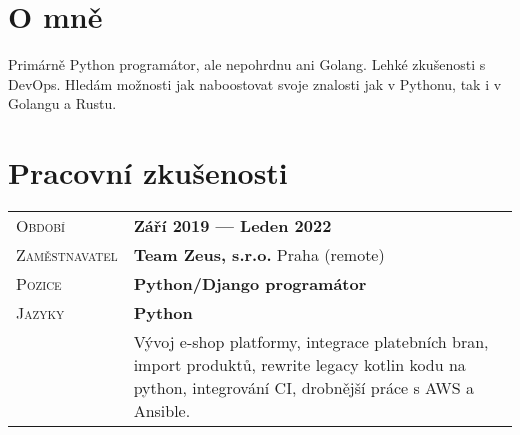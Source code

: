 \documentclass[a4paper, oneside, final]{scrartcl} %
\newcommand{\gray}{\rowcolor[gray]{.90}} %
\begin{document}
\begin{center} %


{\fontsize{36}{36}\selectfont\scshape{}} %

\vspace{1.5cm} %


\section{O mně}

Primárně Python programátor, ale nepohrdnu ani Golang. Lehké zkušenosti s DevOps. Hledám možnosti jak naboostovat svoje znalosti jak v Pythonu, tak i v Golangu a Rustu.\\


\section{Pracovní zkušenosti}

\begin{tabularx}{0.97\linewidth}{>{\raggedleft\scshape}p{3cm}X}
\gray Období & \textbf{Září 2019 --- Leden 2022}\\
\gray Zaměstnavatel & \textbf{Team Zeus, s.r.o.} \hfill Praha (remote)\\
\gray Pozice & \textbf{Python/Django programátor}\\
\gray Jazyky & \textbf{Python}\\
       & Vývoj e-shop platformy, integrace platebních bran, import produktů, rewrite legacy kotlin kodu na python, integrování CI, drobnější práce s AWS a Ansible.
\end{tabularx}

\vspace{12pt}


\end{center}
\end{document}
